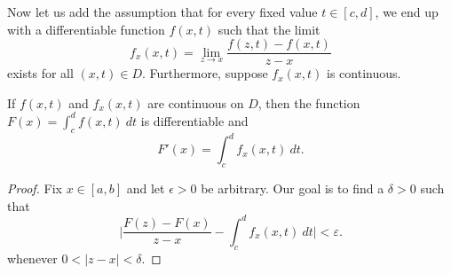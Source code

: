 Now let us add the assumption that for every fixed value \( t \in [c,d] \), we end up with a differentiable function \( f(x,t) \) such that the limit
\[  f_{x}(x,t) = \lim_{ z \to x }  \frac{ f(z,t) - f(x,t)  }{  z -x  }  \] 
exists for all \( (x,t) \in D  \). Furthermore, suppose \( f_{x}(x,t)  \) is continuous.

\begin{theorem}{}{}
    If \( f(x,t)  \) and \( f_{x}(x,t)  \) are continuous on \( D  \), then the function \( F(x) = \int_{ c }^{ d }  f(x,t) \ dt    \) is differentiable and 
    \[  F'(x) = \int_{ c }^{ d } f_{x}(x,t) \ dt. \]
\end{theorem}

\begin{proof}
    Fix \( x \in [a,b]  \) and let \( \epsilon > 0  \) be arbitrary. Our goal is to find a \( \delta > 0  \) such that 
    \[  \Big| \frac{ F(z) - F(x)  }{ z -x  }  - \int_{ c }^{ d }  f_{x}(x,t) \ dt \Big| < \varepsilon. \tag{5} \]
    whenever \( 0 < | z  -x  | < \delta  \).
\end{proof}

